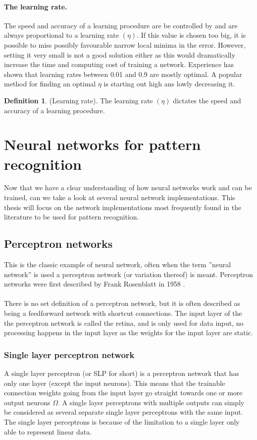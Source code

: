 \documentclass[pdftex,a4paper,12pt,twoside]{report}
\theoremstyle{plain} \newtheorem{theorem}{Theorem} \newtheorem{proposition}{Proposition} \newtheorem{lemma}{Lemma} \newtheorem*{corollary}{Corollary}
\theoremstyle{definition} \newtheorem{definition}{Definition} \newtheorem{conjecture}{Conjecture} \newtheorem*{example}{Example} \newtheorem{algorithm}{Algorithm}
\theoremstyle{remark} \newtheorem*{remark}{Remark} \newtheorem*{note}{Note} \newtheorem{case}{Case}
\begin{document}
\paragraph{The learning rate.}
The speed and accuracy of a learning procedure are be controlled by and are always proportional to a learning rate $(\eta)$. If this value is chosen too big, it is possible to miss possibly favourable narrow local minima in the error. However, setting it very small is not a good solution either as this would dramatically increase the time and computing cost of training a network. Experience has shown that learning rates between 0.01 and 0.9 are mostly optimal. A popular method for finding an optimal $\eta$ is starting out high ans lowly decreasing it.
\begin{definition}
(Learning rate). The learning rate $(\eta)$ dictates the speed and accuracy of a learning procedure.
\end{definition}
\section{Neural networks for pattern recognition}
Now that we have a clear understanding of how neural networks work and can be trained, can we take a look at several neural network implementations. This thesis will focus on the network implementations most frequently found in the literature to be used for pattern recognition.
\subsection{Perceptron networks}
This is the classic example of neural network, often when the term ''neural network'' is used a perceptron network (or variation thereof) is meant. Perceptron networks were first described by Frank Rosenblatt in 1958 \citep{Rosenblat1958}. \\\\There is no set definition of a perceptron network, but it is often described as being a feedforward network with shortcut connections. The input layer of the the perceptron network is called the retina, and is only used for data input, no processing happens in the input layer as the weights for the input layer are static. 
\subsubsection{Single layer perceptron network}
A single layer perceptron (or SLP for short) is a perceptron network that has only one layer (except the input neurons). This means that the trainable connection weights going from the input layer go straight towards one or more output neurons $\Omega$. A single layer perceptrons with multiple outputs can simply be considered as several separate single layer perceptrons with the same input. The single layer perceptrons is because of the limitation to a single layer only able to represent linear data.
\end{document}
